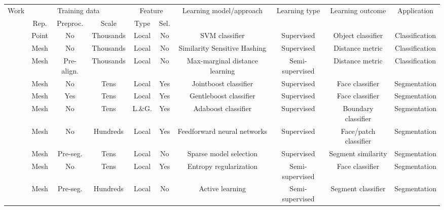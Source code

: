 \begin{table*}[t!]
\scriptsize
  \centering
    \begin{tabular*}{\textwidth}{l|c|c|c|c|c|c|c|c|c}
    \hline
    \multirow{2}{*}{Work} & \multicolumn{3}{c|}{Training data} & \multicolumn{2}{c|}{Feature} & \multirow{2}{*}{Learning model/approach}& \multirow{2}{*}{Learning type} & \multirow{2}{*}{Learning outcome} & \multirow{2}{*}{Application}\\
           \cline{2-6}
                          & Rep. & Preproc. & Scale & Type & Sel. & \multicolumn{1}{r|}{} & \multicolumn{1}{r|}{} & \multicolumn{1}{r|}{} \\
    \hline
    \hline
    \cite{Funkhouser:2005:SBR}  & Point     & No            & Thousands & Local     & No & SVM classifier                   & Supervised        & Object classifier & Classification   \\ \hline
    \cite{Bronstein:2011:SGGW}  & Mesh      & No            & Thousands & Local     & No & Similarity Sensitive Hashing     & Supervised        & Distance metric   & Classification   \\ \hline
    \cite{Huang:2013:FSL}       & Mesh      & Pre-align.	& Thousands	& Local     & No & Max-marginal distance learning   & Semi-supervised	& Distance metric	& Classification   \\ \hline
    \cite{Kalogerakis:2010:LMS} &Mesh	&No	&Tens	&Local	&Yes	&Jointboost classifier	&Supervised	&Face classifier	&Segmentation \\ \hline
    \cite{van-Kaick:2011:PKC}   &Mesh	&Yes	&Tens	&Local	&Yes	&Gentleboost classifier	&Supervised	&Face classifier	&Segmentation \\ \hline
    \cite{Benhabiles:2011:LBE}	&Mesh	&No	&Tens	&L.\&G.	&Yes	&Adaboost classifier	&Supervised	&Boundary classifier	&Segmentation \\ \hline
    \cite{Zhige:2014:SSL}	&Mesh	&No	&Hundreds	&Local	&Yes	&Feedforward neural networks	&Supervised	&Face/patch classifier	&Segmentation \\ \hline
    \cite{Xu:2014:TSS}	&Mesh	&Pre-seg.	&Tens	&Local	&No	&Sparse model selection	&Supervised	&Segment similarity	&Segmentation \\ \hline
    \cite{Lv:2012:SMS}	&Mesh	&No	&Tens	&Local	&Yes	&Entropy regularization	&Semi-supervised	&Face classifier	&Segmentation \\ \hline
    \cite{Wang:2012:ACS}	&Mesh	&Pre-seg.	&Hundreds	&Local	&No	&Active learning	&Semi-supervised	&Segment classifier	&Segmentation \\ \hline

\end{tabular*}
\end{table*}
